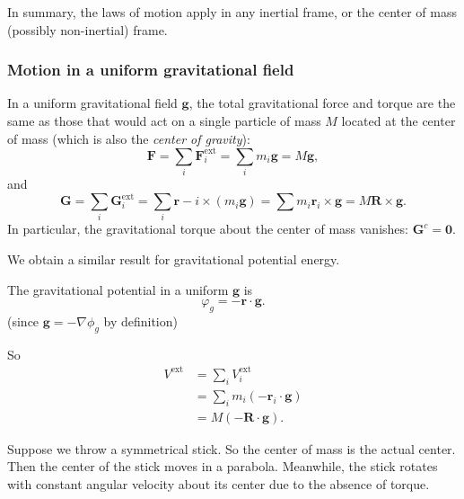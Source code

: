 \documentclass[a4paper]{article}
\begin{document}
In summary, the laws of motion apply in any inertial frame, or the center of mass (possibly non-inertial) frame.

\subsubsection*{Motion in a uniform gravitational field}
In a uniform gravitational field $\mathbf{g}$, the total gravitational force and torque are the same as those that would act on a single particle of mass $M$ located at the center of mass (which is also the \emph{center of gravity}):
\[
  \mathbf{F} = \sum_i \mathbf{F}_i^{\mathrm{ext}} = \sum_i m_i \mathbf{g} = M\mathbf{g},
\]
and
\[
  \mathbf{G} = \sum_i \mathbf{G}_i^{\mathrm{ext}} = \sum_i \mathbf{r}-i \times (m_i \mathbf{g}) = \sum m_i \mathbf{r}_i \times \mathbf{g} = M\mathbf{R}\times \mathbf{g}.
\]
In particular, the gravitational torque about the center of mass vanishes: $\mathbf{G}^c = \mathbf{0}$.

We obtain a similar result for gravitational potential energy.

The gravitational potential in a uniform $\mathbf{g}$ is
\[
  \varphi_g = -\mathbf{r}\cdot \mathbf{g}.
\]
(since $\mathbf{g} = -\nabla \phi_g$ by definition)

So
\begin{align*}
  V^{\mathrm{ext}} &= \sum_i V_i^{\mathrm{ext}}\\
  &= \sum_i m_i (- \mathbf{r}_i \cdot \mathbf{g})\\
  &= M (-\mathbf{R}\cdot \mathbf{g}).
\end{align*}

\begin{eg}
  Suppose we throw a symmetrical stick. So the center of mass is the actual center. Then the center of the stick moves in a parabola. Meanwhile, the stick rotates with constant angular velocity about its center due to the absence of torque.
\end{eg}
\end{document}
